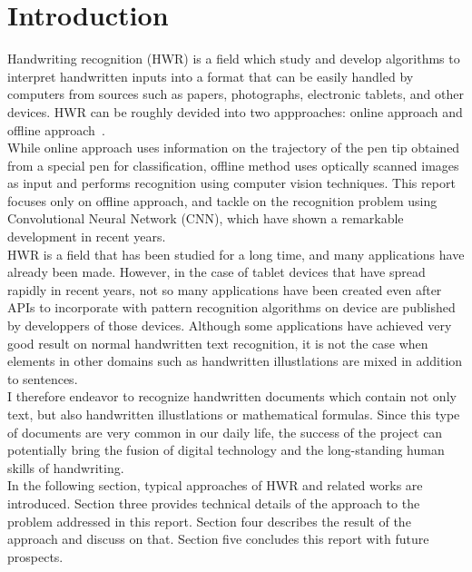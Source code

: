 \section{Introduction}

Handwriting recognition (HWR) is a field which study and develop algorithms to
interpret handwritten inputs into a format that can be easily handled by computers
from sources such as papers, photographs, electronic tablets, and other devices.
HWR can be roughly devided into two appproaches:
online approach and offline approach~\cite{plamondon2000online}.\\
While online approach uses information on the trajectory of the pen tip
obtained from a special pen for classification, offline method uses
optically scanned images as input and performs recognition using computer vision techniques.
This report focuses only on offline approach, and tackle on the recognition problem
using Convolutional Neural Network (CNN), which have shown a remarkable development in recent years.\\

HWR is a field that has been studied for a long time, and many applications have already been made.
However, in the case of tablet devices that have spread rapidly in recent years, not so many applications
have been created even after APIs to incorporate with pattern recognition algorithms on device are published
by developpers of those devices. Although some applications have achieved very good
result on normal handwritten text recognition, it is not the case when elements in other domains
such as handwritten illustlations are mixed in addition to sentences.\\
I therefore endeavor to recognize handwritten documents which contain not only text, but also
handwritten illustlations or mathematical formulas. Since this type of documents are very common
in our daily life, the success of the project can potentially bring the fusion of digital
technology and the long-standing human skills of handwriting. \\

In the following section, typical approaches of HWR and related works are introduced.
Section three provides technical details of the approach to the problem addressed in
this report. Section four describes the result of the approach and discuss on that.
Section five concludes this report with future prospects.\\
